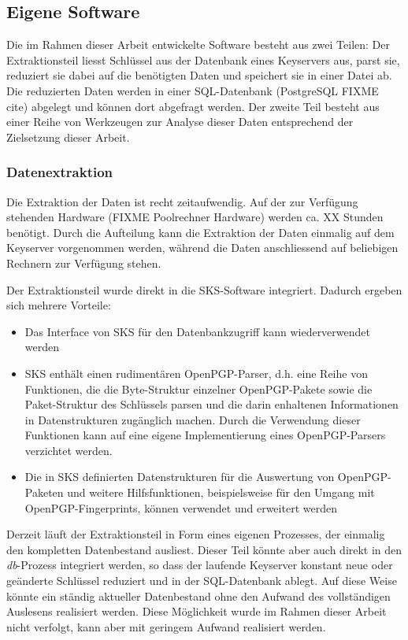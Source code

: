 \subsection{Eigene Software}
\label{ch:Grundlagen:sec:Design:subsec:eigene-software}

Die im Rahmen dieser Arbeit entwickelte Software besteht aus zwei
Teilen: Der Extraktionsteil liesst Schlüssel aus der Datenbank eines
Keyservers aus, parst sie, reduziert sie dabei auf die benötigten
Daten und speichert sie in einer Datei ab. Die reduzierten Daten
werden in einer SQL-Datenbank (PostgreSQL FIXME cite) abgelegt und
können dort abgefragt werden. Der zweite Teil besteht aus einer Reihe
von Werkzeugen zur Analyse dieser Daten entsprechend der Zielsetzung
dieser Arbeit.

\subsubsection{Datenextraktion}
\label{sec:datenextraktion}

Die Extraktion der Daten ist recht zeitaufwendig. Auf der zur
Verfügung stehenden Hardware (FIXME Poolrechner Hardware) werden
ca. XX Stunden benötigt. Durch die Aufteilung kann die Extraktion der
Daten einmalig auf dem Keyserver vorgenommen werden, während die Daten
anschliessend auf beliebigen Rechnern zur Verfügung stehen.

Der Extraktionsteil wurde direkt in die SKS-Software
integriert. Dadurch ergeben sich mehrere Vorteile: 

\begin{itemize}
\item Das Interface von SKS für den Datenbankzugriff kann
  wiederverwendet werden
\item SKS enthält einen rudimentären OpenPGP-Parser, d.h. eine Reihe
  von Funktionen, die die Byte-Struktur einzelner OpenPGP-Pakete sowie
  die Paket-Struktur des Schlüssels parsen und die darin enhaltenen
  Informationen in Datenstrukturen zugänglich machen. Durch die
  Verwendung dieser Funktionen kann auf eine eigene Implementierung
  eines OpenPGP-Parsers verzichtet werden.
\item Die in SKS definierten Datenstrukturen für die Auswertung von
  OpenPGP-Paketen und weitere Hilfsfunktionen, beispielsweise für den
  Umgang mit OpenPGP-Fingerprints, können verwendet und erweitert werden
\end{itemize}

Derzeit läuft der Extraktionsteil in Form eines eigenen Prozesses, der
einmalig den kompletten Datenbestand ausliest. Dieser Teil könnte aber
auch direkt in den \emph{db}-Prozess integriert werden, so dass der
laufende Keyserver konstant neue oder geänderte Schlüssel reduziert
und in der SQL-Datenbank ablegt. Auf diese Weise könnte ein ständig
aktueller Datenbestand ohne den Aufwand des vollständigen Auslesens
realisiert werden. Diese Möglichkeit wurde im Rahmen dieser Arbeit
nicht verfolgt, kann aber mit geringem Aufwand realisiert werden.

